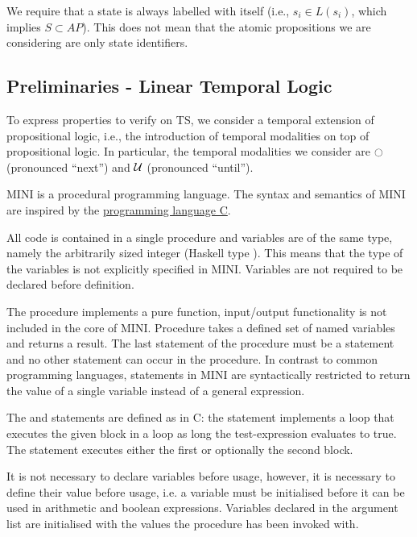 \documentclass{article}
\begin{document}
We require that a state is always labelled with itself 
(i.e., $s_i \in L(s_i)$, which implies $S \subset AP$). This does not mean that the atomic propositions 
we are considering are only state identifiers.

\subsection{Preliminaries - Linear Temporal Logic}
To express properties to verify on TS, we consider a temporal extension of propositional logic, i.e., 
the introduction of temporal modalities on top of propositional logic. In particular, the temporal
modalities we consider are $\ocircle$ (pronounced ``next'') and $\mathbin{\mathcal{U}}$ (pronounced ``until'').







MINI is a procedural programming language. The syntax and semantics of MINI are inspired by the \href{https://en.wikipedia.org/wiki/C_(programming_language)}{programming language C}.

All code is contained in a single procedure  and variables are of the same type, namely the arbitrarily sized integer (Haskell type ). This means that the type of the variables is not explicitly specified in MINI. Variables are not required to be declared before definition.

The procedure  implements a pure function, input/output functionality is not included in the core of MINI. Procedure  takes a defined set of named variables and returns a result. The last statement of the procedure must be a  statement and no other  statement can occur in the procedure. In contrast to common programming languages,  statements in MINI are syntactically restricted to return the value of a single variable instead of a general expression.

The  and  statements are defined as in C: the  statement implements a loop that executes the given block in a loop as long the test-expression evaluates to true. The  statement executes either the first or optionally the second block.

It is not necessary to declare variables before usage, however, it is necessary to define their value before usage, i.e. a variable must be initialised before it can be used in arithmetic and boolean expressions.
Variables declared in the argument list are initialised with the values the procedure has been invoked with.
\end{document}
